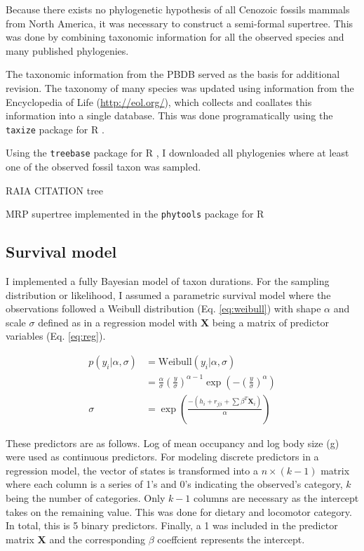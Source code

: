 \documentclass[12pt,letterpaper]{article}
\begin{document}
Because there exists no phylogenetic hypothesis of all Cenozoic fossils mammals from North America, it was necessary to construct a semi-formal supertree. This was done by combining taxonomic information for all the observed species and many published phylogenies.

The taxonomic information from the PBDB served as the basis for additional revision. The taxonomy of many species was updated using information from the Encyclopedia of Life (\url{http://eol.org/}), which collects and coallates this information into a single database. This was done programatically using the \texttt{taxize} package for R \citep{2013taxize}.

Using the \texttt{treebase} package for R \citep{boettiger2014treebase}, I downloaded all phylogenies where at least one of the observed fossil taxon was sampled.

RAIA CITATION tree

MRP supertree implemented in the \texttt{phytools} package for R \citep{revell2012phytools}


\subsection{Survival model}

I implemented a fully Bayesian model of taxon durations. For the sampling distribution or likelihood, I assumed a parametric survival model where the observations followed a Weibull distribution (Eq. \ref{eq:weibull}) with shape \(\alpha\) and scale \(\sigma\) defined as in a regression model with \(\mathbf{X}\) being a matrix of predictor variables (Eq. \ref{eq:reg}).

\begin{align}
  p(y_{i}|\alpha, \sigma) &= \mathrm{Weibull}(y_{i}|\alpha, \sigma) \nonumber \\ 
  &= \frac{\alpha}{\sigma} \left(\frac{y}{\sigma}\right)^{\alpha - 1} \exp\left(-\left(\frac{y}{\sigma}\right)^{\alpha}\right) \label{eq:weibull}\\
  \sigma &= \exp\left(\frac{-(h_{i} + r_{j | i} + \sum \beta^{T} \mathbf{X}_{i})}{\alpha}\right) \label{eq:reg}
\end{align}

These predictors are as follows. Log of mean occupancy and log body size (g) were used as continuous predictors. For modeling discrete predictors in a regression model, the vector of states is transformed into a \(n \times (k - 1)\) matrix where each column is a series of 1's and 0's indicating the observed's category, \(k\) being the number of categories. Only \(k - 1\) columns are necessary as the intercept takes on the remaining value. This was done for dietary and locomotor category. In total, this is 5 binary predictors. Finally, a 1 was included in the predictor matrix \(\mathbf{X}\) and the corresponding \(\beta\) coeffcient represents the intercept.
\end{document}
